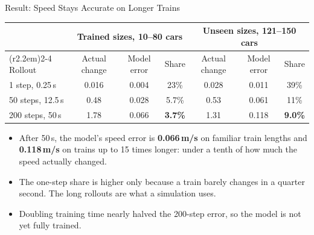 \documentclass[aspectratio=169,11pt]{beamer}
\begin{document}
\begin{frame}{Result: Speed Stays Accurate on Longer Trains}
  \vspace{0.3em}
  \centering
  {\footnotesize
  \begin{tabular}{@{}lccc@{\hspace{2.2em}}ccc@{}}
    \toprule
     & \multicolumn{3}{c}{\textbf{Trained sizes, 10--80 cars}}
     & \multicolumn{3}{c}{\textbf{Unseen sizes, 121--150 cars}} \\
    \cmidrule(r{2.2em}){2-4}\cmidrule{5-7}
    Rollout & Actual change & Model error & Share
            & Actual change & Model error & Share \\
    \midrule
    1 step, 0.25\,s  & 0.016 & 0.004 & 23\%  & 0.028 & 0.011 & 39\% \\
    50 steps, 12.5\,s & 0.48  & 0.028 & 5.7\% & 0.53  & 0.061 & 11\% \\
    200 steps, 50\,s  & 1.78  & 0.066 & \textbf{3.7\%} & 1.31 & 0.118 & \textbf{9.0\%} \\
    \bottomrule
  \end{tabular}}

  \vspace{0.3em}

  \vspace{0.8em}
  \begin{minipage}{0.94\textwidth}\small
    \begin{itemize}\setlength\itemsep{0.35em}
      \item After 50\,s, the model's speed error is \textbf{0.066\,m/s} on
            familiar train lengths and \textbf{0.118\,m/s} on trains up to 15
            times longer: under a tenth of how much the speed actually changed.
      \item The one-step share is higher only because a train barely changes
            in a quarter second. The long rollouts are what a simulation uses.
      \item Doubling training time nearly halved the 200-step error, so the
            model is not yet fully trained.
    \end{itemize}
  \end{minipage}
\end{frame}
\end{document}
